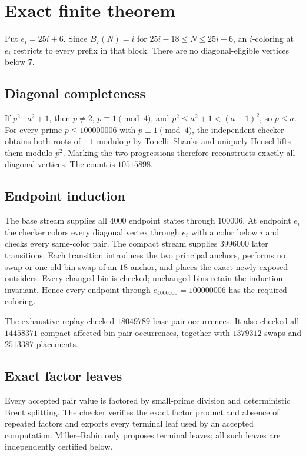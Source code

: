 \documentclass[11pt]{article}
\newcommand{\Bseven}{B_7}
\begin{document}
\section{Exact finite theorem}

Put $e_i=25i+6$.  Since $\Bseven(N)=i$ for
$25i-18\le N\le25i+6$, an $i$-coloring at $e_i$ restricts to every
prefix in that block.  There are no diagonal-eligible vertices below $7$.

\subsection{Diagonal completeness}

If $p^2\mid a^2+1$, then $p\ne2$, $p\equiv1\pmod4$, and
$p^2\le a^2+1<(a+1)^2$, so $p\le a$.  For every prime
$p\le100000006$ with $p\equiv1\pmod4$, the independent checker obtains
both roots of $-1$ modulo $p$ by Tonelli--Shanks and uniquely Hensel-lifts
them modulo $p^2$.  Marking the two progressions therefore reconstructs
exactly all diagonal vertices.  The count is $10515898$.

\subsection{Endpoint induction}

The base stream supplies all $4000$ endpoint states through $100006$.
At endpoint $e_i$ the checker colors every diagonal vertex through $e_i$ with
a color below $i$ and checks every same-color pair.  The compact stream supplies
$3996000$ later transitions.  Each transition introduces the two principal
anchors, performs no swap or one old-bin swap of an $18$-anchor, and places
the exact newly exposed outsiders.  Every changed bin is checked; unchanged
bins retain the induction invariant.  Hence every endpoint through
$e_{4000000}=100000006$ has the required coloring.

The exhaustive replay checked $18049789$ base pair occurrences.
It also checked all $14458371$ compact affected-bin pair occurrences,
together with $1379312$ swaps and $2513387$ placements.

\subsection{Exact factor leaves}

Every accepted pair value is factored by small-prime division and
deterministic Brent splitting.  The checker verifies the exact factor product
and absence of repeated factors and exports every terminal leaf used by an
accepted computation.  Miller--Rabin only proposes terminal leaves; all such
leaves are independently certified below.
\end{document}
